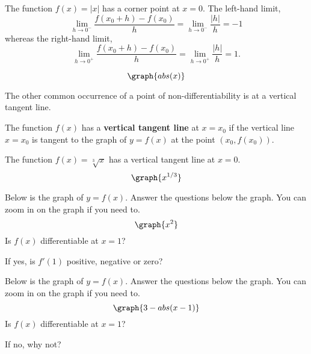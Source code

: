\documentclass{ximera}
\begin{document}
\begin{example}
The function $f(x) = |x|$ has a corner point at $x = 0$.
The left-hand limit, 
\[
\lim_{h\to 0^-} \frac{f(x_0 +h)-f(x_0)}{h} = \lim_{h\to 0^-} \frac{|h|}{h} = -1
\]
whereas the right-hand limit,
\[
\lim_{h\to 0^+} \frac{f(x_0 +h)-f(x_0)}{h} = \lim_{h\to 0^+} \frac{|h|}{h} = 1.
\]

\[
\graph{abs(x)}
\]
\end{example}

The other common occurrence of a point of non-differentiability is at a vertical tangent line.


\begin{definition} The function $f(x)$ has a \textbf{vertical tangent line} at $x = x_0$ if
the vertical line $x = x_0$ is tangent to the graph of $y = f(x)$ at the point $(x_0, f(x_0))$.
\end{definition}

\begin{example}
The function $f(x) = \sqrt[3] x$ has a vertical tangent line at $x = 0$.
\[
\graph{x^{1/3}}
\]
\end{example}


\begin{problem}
Below is the graph of $y = f(x)$.  Answer the questions below the graph.  You can zoom in on the graph if you need to.
\[
\graph{x^2}
\]
Is $f(x)$ differentiable at $x = 1$?
\begin{multipleChoice}
\end{multipleChoice}
If yes, is $f'(1)$ positive, negative or zero?
\begin{multipleChoice}
\end{multipleChoice}
\end{problem}




\begin{problem}
Below is the graph of $y = f(x)$.  Answer the questions below the graph.  You can zoom in on the graph if you need to.
\[
\graph{3-abs(x-1)}
\]
Is $f(x)$ differentiable at $x = 1$?
\begin{multipleChoice}
\end{multipleChoice}
If no, why not?
\begin{multipleChoice}
\end{multipleChoice}
\end{problem}
\end{document}
